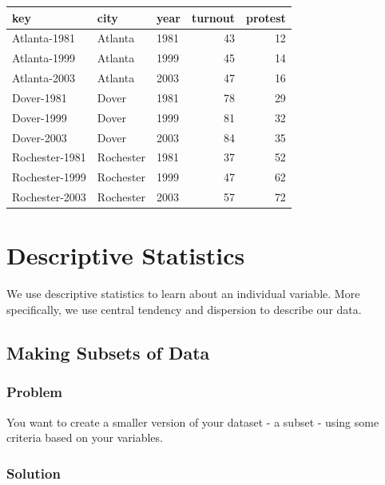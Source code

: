 \documentclass[
]{book}
\begin{document}
\begin{tabular}{l|l|l|r|r}
\hline
key & city & year & turnout & protest\\
\hline
Atlanta-1981 & Atlanta & 1981 & 43 & 12\\
\hline
Atlanta-1999 & Atlanta & 1999 & 45 & 14\\
\hline
Atlanta-2003 & Atlanta & 2003 & 47 & 16\\
\hline
Dover-1981 & Dover & 1981 & 78 & 29\\
\hline
Dover-1999 & Dover & 1999 & 81 & 32\\
\hline
Dover-2003 & Dover & 2003 & 84 & 35\\
\hline
Rochester-1981 & Rochester & 1981 & 37 & 52\\
\hline
Rochester-1999 & Rochester & 1999 & 47 & 62\\
\hline
Rochester-2003 & Rochester & 2003 & 57 & 72\\
\hline
\end{tabular}

\hypertarget{descriptive-statistics}{%
\chapter{Descriptive Statistics}\label{descriptive-statistics}}

We use descriptive statistics to learn about an individual variable. More specifically, we use central tendency and dispersion to describe our data.

\hypertarget{subset}{%
\section{Making Subsets of Data}\label{subset}}

\hypertarget{problem-29}{%
\subsection{Problem}\label{problem-29}}

You want to create a smaller version of your dataset - a subset - using some criteria based on your variables.

\hypertarget{solution-28}{%
\subsection{Solution}\label{solution-28}}
\end{document}
